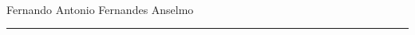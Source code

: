 \begin{center}
	\hfill \break
	{ \huge \bfseries \rttitulo} \\[0.2 cm]
	Fernando Antonio Fernandes Anselmo
	\rule{\linewidth}{0.2 mm} \\[0.4 cm]
\end{center}


